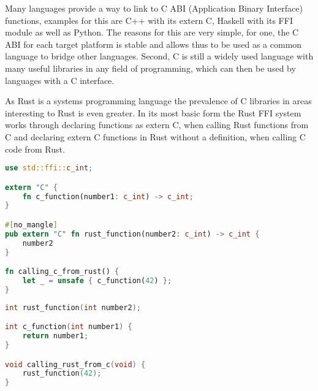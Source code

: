 Many languages provide a way to link to C ABI (Application Binary Interface) functions, examples for this are C++ with its extern C, Haskell with its FFI module as well as Python.
The reasons for this are very simple, for one, the C ABI for each target platform is stable and allows thus to be used as a common language to bridge other languages.
Second, C is still a widely used language with many useful libraries in any field of programming, which can then be used by languages with a C interface.

As Rust is a systems programming language the prevalence of C libraries in areas interesting to Rust is even greater.
In its most basic form the Rust FFI system works through declaring functions as extern C, when calling Rust functions from C
and declaring extern C functions in Rust without a definition, when calling C code from Rust.

\begin{lstlisting}[language=Rust,style=colouredRust]
use std::ffi::c_int;

extern "C" {
    fn c_function(number1: c_int) -> c_int;
}

#[no_mangle]
pub extern "C" fn rust_function(number2: c_int) -> c_int {
    number2
}

fn calling_c_from_rust() {
    let _ = unsafe { c_function(42) };
}
\end{lstlisting}

\begin{lstlisting}[language=C]
int rust_function(int number2);

int c_function(int number1) {
    return number1;
}

void calling_rust_from_c(void) {
    rust_function(42);
}
\end{lstlisting}

